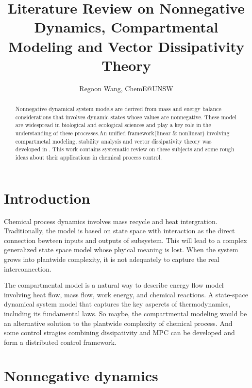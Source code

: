 \documentclass{paper}
\begin{document}
 
\title{Literature Review on Nonnegative Dynamics, Compartmental Modeling and Vector Dissipativity Theory}
\author{Regoon Wang, ChemE@UNSW} 


\maketitle
\begin{abstract}
Nonnegative dynamical system models are derived from mass and energy balance considerations that
involves dynamic states whose values are nonnegative. These model are widespread in biological
and ecological sciences and play a key role in the understanding of these processes.An unified
framework(linear \& nonlinear) involving compartmetal modeling, stability analysis and vector 
dissipativity theory was developed in \cite{bern_comp,hadd_non,hadd_thermo1,hadd_thermo2}. 
This work contains systematic review on these subjects and some rough ideas about their applications
in chemical process control.
\end{abstract} 

\tableofcontents
\section{Introduction}
Chemical process dynamics involves mass recycle and heat intergration. Traditionally, the model is based on state
space with interaction as the direct connection bewteen inputs and outputs of subsystem. This will lead to
a complex generalized state space model whose phyical meaning is lost. When the system grows into plantwide
complexity, it is not adequately to capture the real interconnection.

The compartmental model is a natural way to describe energy flow model involving heat flow, mass flow, work energy, 
and chemical reactions. A state-space dynamical system model that captures the key aspercts of thermodynamics, 
including its fundamental laws. So maybe, the compartmental modeling would be an alternative solution to the
plantwide complexity of chemical process. And some control stragies combining dissipativity and MPC can be
developed and form a distributed control framework.
\section{Nonnegative dynamics}
\end{document}
